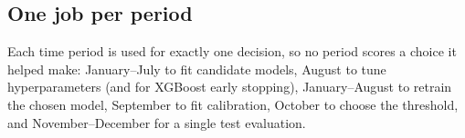 \subsection{One job per period}
Each time period is used for exactly one decision, so no period scores a choice it helped make:
January--July to fit candidate models, August to tune hyperparameters (and for XGBoost early
stopping), January--August to retrain the chosen model, September to fit calibration, October to
choose the threshold, and November--December for a single test evaluation.
